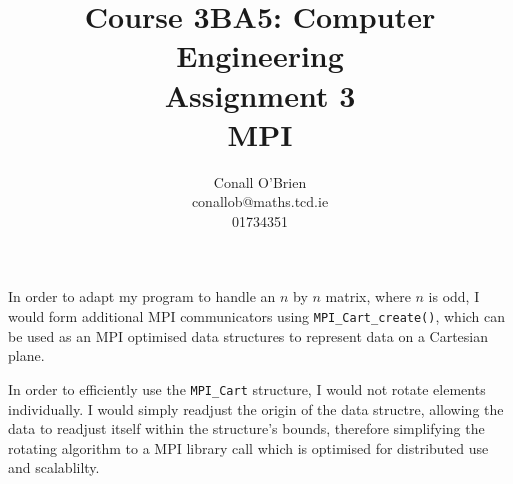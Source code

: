 \documentclass[a4paper,12pt]{article}
\begin{document}
\title{Course 3BA5: Computer Engineering \\ Assignment 3 \\ MPI} 

\author{Conall O'Brien \\ conallob@maths.tcd.ie \\ 01734351}

\maketitle

\section{}

\subsection{}



\subsection{}



\subsection{}



\subsection{}

\section{}

\subsection{}

In order to adapt my program to handle an $n$ by $n$ matrix, where $n$
is odd, I would form additional MPI communicators using 
\verb!MPI_Cart_create()!, which can be used as an MPI optimised data 
structures to represent data on a Cartesian plane.


In order to efficiently use the \verb!MPI_Cart! structure, I would not
rotate elements individually. I would simply readjust the origin of 
the data structre, allowing the data to readjust itself within the
structure's bounds, therefore simplifying the rotating algorithm to a
MPI library call which is optimised for distributed use and scalablilty.     
\end{document}
